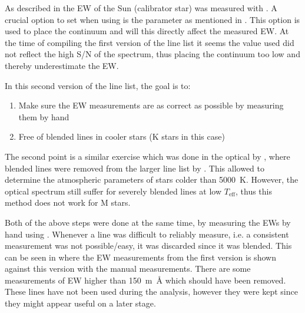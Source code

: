 As described in  the EW of the Sun (calibrator star) was measured with
\ARES. A crucial option to set when using \ARES is the  parameter as mentioned in
. This option is used to place the continuum and will this directly affect the
measured EW. At the time of compiling the first version of the line list it seems the 
value used did not reflect the high S/N of the spectrum, thus placing the continuum too low and
thereby underestimate the EW.

In this second version of the line list, the goal is to:
\begin{enumerate}
  \item Make sure the EW measurements are as correct as possible by measuring them by hand
  \item Free of blended lines in cooler stars (K stars in this case)
\end{enumerate}
The second point is a similar exercise which was done in the optical by \citet{Tsantaki2013}, where
blended lines were removed from the larger line list by \citet{Sousa2008a}. This allowed to
determine the atmospheric parameters of stars colder than \SI{5000}{K}. However, the optical
spectrum still suffer for severely blended lines at low $T_\mathrm{eff}$, thus this method does not
work for M stars.

Both of the above steps were done at the same time, by measuring the EWs by hand using .
Whenever a line was difficult to reliably measure, i.e. a consistent measurement was not
possible/easy, it was discarded since it was blended. This can be seen in
 where the EW measurements from the first version is shown against
this version with the manual measurements. There are some measurements of EW higher than
\SI{150}{m\angstrom} which should have been removed. These lines have not been used during the
analysis, however they were kept since they might appear useful on a later stage.

